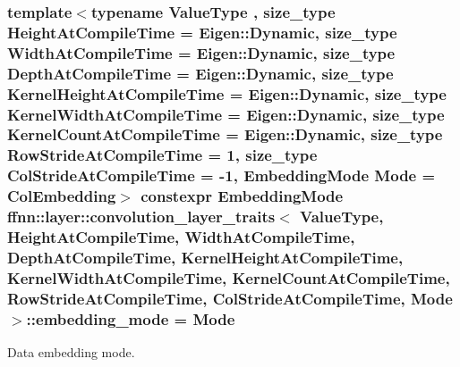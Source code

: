 \hypertarget{structffnn_1_1layer_1_1convolution__layer__traits_ab598247847360cd7a710c9b0b14496ae}{
\subsubsection[{embedding\-\_\-mode}]{\setlength{\rightskip}{0pt plus 5cm}template$<$typename Value\-Type , size\-\_\-type Height\-At\-Compile\-Time = Eigen\-::\-Dynamic, size\-\_\-type Width\-At\-Compile\-Time = Eigen\-::\-Dynamic, size\-\_\-type Depth\-At\-Compile\-Time = Eigen\-::\-Dynamic, size\-\_\-type Kernel\-Height\-At\-Compile\-Time = Eigen\-::\-Dynamic, size\-\_\-type Kernel\-Width\-At\-Compile\-Time = Eigen\-::\-Dynamic, size\-\_\-type Kernel\-Count\-At\-Compile\-Time = Eigen\-::\-Dynamic, size\-\_\-type Row\-Stride\-At\-Compile\-Time = 1, size\-\_\-type Col\-Stride\-At\-Compile\-Time = -\/1, Embedding\-Mode Mode = Col\-Embedding$>$ constexpr Embedding\-Mode {\bf ffnn\-::layer\-::convolution\-\_\-layer\-\_\-traits}$<$ Value\-Type, Height\-At\-Compile\-Time, Width\-At\-Compile\-Time, Depth\-At\-Compile\-Time, Kernel\-Height\-At\-Compile\-Time, Kernel\-Width\-At\-Compile\-Time, Kernel\-Count\-At\-Compile\-Time, Row\-Stride\-At\-Compile\-Time, Col\-Stride\-At\-Compile\-Time, Mode $>$\-::embedding\-\_\-mode = Mode\hspace{0.3cm}{\ttfamily [static]}}}\label{structffnn_1_1layer_1_1convolution__layer__traits_ab598247847360cd7a710c9b0b14496ae}


Data embedding mode. 

